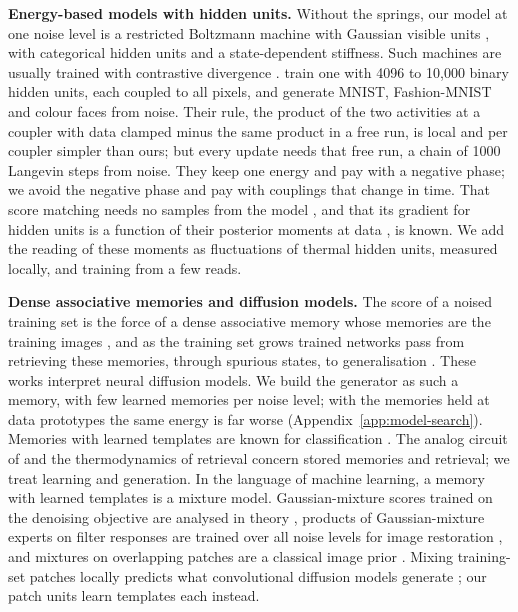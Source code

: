 \documentclass{article}
\begin{document}
\textbf{Energy-based models with hidden units.}
Without the springs, our model at one noise level is a restricted Boltzmann
machine with Gaussian visible units \citep{welling2004exponential}, with
categorical hidden units and a state-dependent stiffness. Such machines are
usually trained with contrastive divergence \citep{hinton2002training}.
\citet{liao2022gaussian} train one with 4096 to 10{,}000 binary hidden units,
each coupled to all pixels, and generate MNIST, Fashion-MNIST and colour
faces from noise. Their rule, the product of the two activities at a coupler
with data clamped minus the same product in a free run, is local and per
coupler simpler than ours; but every update needs that free run, a chain of
1000 Langevin steps from noise. They keep one energy and pay with a negative
phase; we avoid the negative phase and pay with couplings that change in
time. That score matching needs no samples from the model
\citep{hyvarinen2005estimation,hyvarinen2007connections}, and that its
gradient for hidden units is a function of their posterior moments at data
\citep{swersky2011autoencoders,vincent2011connection}, is known. We add the
reading of these moments as fluctuations of thermal hidden units, measured
locally, and training from a few reads.

\textbf{Dense associative memories and diffusion models.}
The score of a noised training set is the force of a dense associative
memory whose memories are the training images
\citep{hoover2023memory,ambrogioni2024search}, and as the training set grows
trained networks pass from retrieving these memories, through spurious
states, to generalisation \citep{pham2026emergence}. These works interpret
neural diffusion models. We build the generator as such a memory, with few
learned memories per noise level; with the memories held at data prototypes
the same energy is far worse (Appendix~\ref{app:model-search}). Memories with
learned templates are known for classification \citep{krotov2016dense}. The
analog circuit of \citet{bacvanski2025dense} and the thermodynamics of
retrieval \citep{rooke2026stochastic} concern stored memories and retrieval;
we treat learning and generation.
In the language of machine learning, a memory with learned templates is a
mixture model. Gaussian-mixture scores trained on the denoising objective
are analysed in theory \citep{shah2023learning}, products of Gaussian-mixture
experts on filter responses are trained over all noise levels for image
restoration \citep{zach2024product}, and mixtures on overlapping patches are
a classical image prior \citep{zoran2011learning}. Mixing training-set
patches locally predicts what convolutional diffusion models generate
\citep{kamb2025analytic}; our patch units learn \Mpatch{} templates each
instead.
\end{document}
